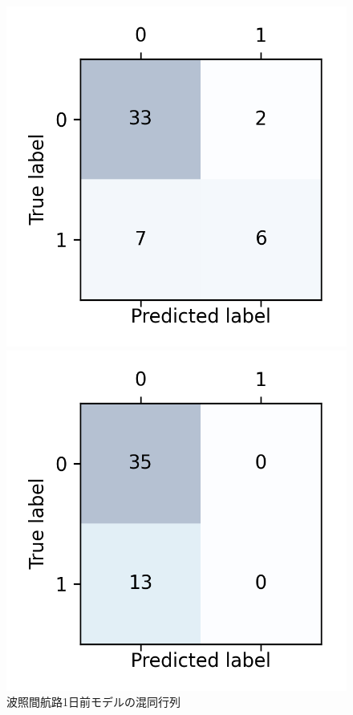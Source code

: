 \begin{figure}[H]
 \begin{minipage}{0.5\hsize}
  \begin{center}
   \includegraphics[keepaspectratio, scale=0.5]{fig/chapter4/wind_hateruma_1/hateruma_route_hateruma_dep_1.png}
  \end{center}
  \caption{波照間航路1日前モデルの混同行列}
  \label{wind_hateruma_1_conf}
 \end{minipage}
 \begin{minipage}{0.5\hsize}
  \begin{center}
  \includegraphics[keepaspectratio, scale=0.5]{fig/chapter4/wind_hateruma_2/hateruma_route_hateruma_dep_2.png}

\end{center}
\end{minipage}
\end{figure}
